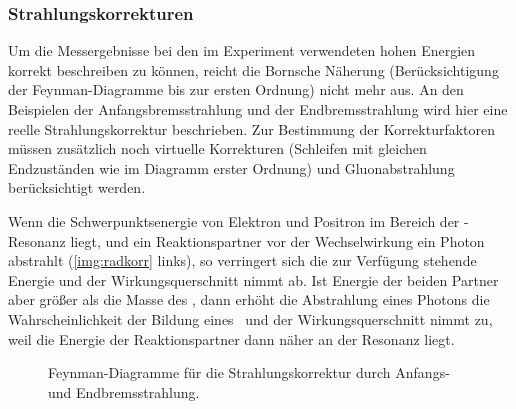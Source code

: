 \subsubsection*{Strahlungskorrekturen}
\label{sect:strahlungskorr}
Um die Messergebnisse bei den im Experiment verwendeten hohen Energien korrekt beschreiben zu können,
reicht die Bornsche Näherung (Berücksichtigung der Feynman-Diagramme bis zur ersten Ordnung) nicht mehr aus.
An den Beispielen der Anfangsbremsstrahlung und der Endbremsstrahlung wird hier
eine reelle Strahlungskorrektur beschrieben.
Zur Bestimmung der Korrekturfaktoren müssen zusätzlich noch virtuelle Korrekturen (Schleifen mit gleichen Endzuständen 
wie im Diagramm erster Ordnung) und Gluonabstrahlung berücksichtigt werden.

Wenn die Schwerpunktsenergie von Elektron und Positron im Bereich der \Z-Resonanz liegt,
und ein Reaktionspartner vor der Wechselwirkung ein Photon abstrahlt (\autoref{img:radkorr} links),
so verringert sich die zur Verfügung stehende Energie und der Wirkungsquerschnitt nimmt ab.
Ist Energie der beiden Partner aber größer als die Masse des \Z, dann erhöht die Abstrahlung
eines Photons die Wahrscheinlichkeit der Bildung eines \Z\ und der Wirkungsquerschnitt nimmt zu,
weil die Energie der Reaktionspartner dann
näher an der Resonanz liegt.

\begin{figure}[H]
    \centering
    \def\svgwidth{0.75\textwidth}
    
    \caption{Feynman-Diagramme für die Strahlungskorrektur durch Anfangs- und Endbremsstrahlung.}
    \label{img:radkorr}
\end{figure}

